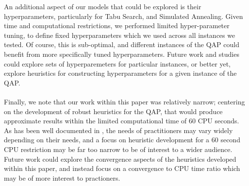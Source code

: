 \documentclass[a4paper,10pt]{article}
\begin{document}
An additional aspect of our models that could be explored is their hyperparameters, particularly for Tabu Search, and Simulated Annealing. Given time and computational restrictions, we performed limited hyper-parameter tuning, to define fixed hyperparameters which we used across all instances we tested. Of course, this is sub-optimal, and different instances of the QAP could benefit from more specifically tuned hyperparameters. Future work and studies could explore sets of hyperparemeters for particular instances, or better yet, explore heuristics for constructing hyperparameters for a given instance of the QAP. \\
\\
Finally, we note that our work within this paper was relatively narrow; centering on the development of robust heuristics for the QAP, that would produce approximate results within the limited computational time of 60 CPU seconds. As has been well documented in \cite{AlgorithmicsTextbook}, the needs of practitioners may vary widely depending on their needs, and a focus on heuristic development for a 60 second CPU restriction may be far too narrow to be of interest to a wider audience. Future work could explore the convergence aspects of the heuristics developed within this paper, and instead focus on a convergence to CPU time ratio which may be of more interest to practioners.




\newpage
\end{document}
